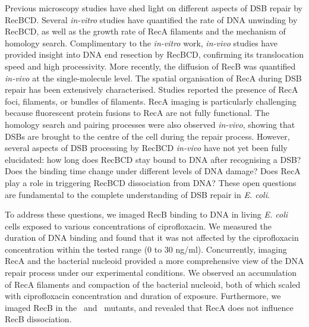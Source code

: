 Previous microscopy studies have shed light on different aspects of DSB repair by RecBCD. Several \emph{in-vitro} studies have quantified the rate of DNA unwinding by RecBCD\cite{Spies2003,Liu2013}, as well as the growth rate of RecA filaments\cite{Joo2006,Galletto2006,Handa2009} and the mechanism of homology search\cite{Forget2012,Ragunathan2012}. Complimentary to the \emph{in-vitro} work, \emph{in-vivo} studies have provided insight into DNA end resection by RecBCD\cite{Wiktor2018}, confirming its translocation speed and high processivity. More recently, the diffusion of RecB was quantified \emph{in-vivo} at the single-molecule level\cite{Lepore2023}. The spatial organisation of RecA during DSB repair has been extensively characterised. Studies reported the presence of RecA foci\cite{Renzette2005,Renzette2007,Centore2007,Amarh2018}, filaments\cite{Kidane2005}, or bundles of filaments\cite{Lesterlin2013,Ghodke2019}. RecA imaging is particularly challenging because fluorescent protein fusions to RecA are not fully functional. The homology search and pairing processes were also observed \emph{in-vivo}, showing that DSBs are brought to the centre of the cell during the repair process\cite{Badrinarayanan2015,Wiktor2021}. However, several aspects of DSB processing by RecBCD \emph{in-vivo} have not yet been fully elucidated: how long does RecBCD stay bound to DNA after recognising a DSB? Does the binding time change under different levels of DNA damage? Does RecA play a role in triggering RecBCD dissociation from DNA? These open questions are fundamental to the complete understanding of DSB repair in \emph{E. coli}.

To address these questions, we imaged RecB binding to DNA in living \emph{E. coli} cells exposed to various concentrations of ciprofloxacin. We measured the duration of DNA binding and found that it was not affected by the ciprofloxacin concentration within the tested range (0 to 30 ng/ml). Concurrently, imaging RecA and the bacterial nucleoid provided a more comprehensive view of the DNA repair process under our experimental conditions. We observed an accumulation of RecA filaments and compaction of the bacterial nucleoid, both of which scaled with ciprofloxacin concentration and duration of exposure. Furthermore, we imaged RecB in the \dreca\ and \geneteneighty\ mutants, and revealed that RecA does not influence RecB dissociation.
